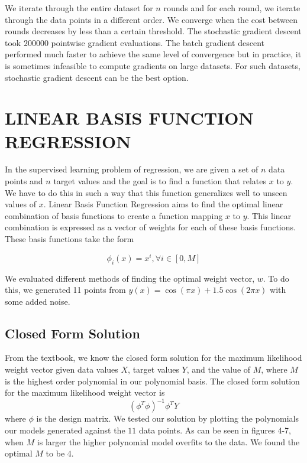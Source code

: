 \documentclass[a4paper,twoside]{article}
\begin{document}
 We iterate through the entire dataset for $n$ rounds and for each round, we iterate through the data points in a different order. We converge when the cost between rounds decreases by less than a certain threshold. The stochastic gradient descent took $200000$ pointwise gradient evaluations. The batch gradient descent performed much faster to achieve the same level of convergence but in practice, it is sometimes infeasible to compute gradients on large datasets. For such datasets, stochastic gradient descent can be the best option.



\section{\uppercase{Linear Basis Function Regression}}

In the supervised learning problem of regression, we are given a set of $n$ data points and $n$ target values and the goal is to find a function that relates $x$ to $y$. We have to do this in such a way that this function generalizes well to unseen values of $x$. Linear Basis Function Regression aims to find the optimal linear combination of basis functions to create a function mapping $x$ to $y$. This linear combination is expressed as a vector of weights for each of these basis functions. These basis functions take the form

\begin{equation}
\phi_i(x) = x^i,  \forall i \in [0,M]
\end{equation}

We evaluated different methods of finding the optimal weight vector, $w$. To do this, we generated 11 points from $y(x) = \cos(\pi x)+1.5 \cos(2 \pi x)$ with some added noise. 

\subsection{Closed Form Solution}

From the textbook, we know the closed form solution for the maximum likelihood weight vector given data values $X$, target values $Y$, and the value of $M$, where $M$ is the highest order polynomial in our polynomial basis. The closed form solution for the maximum likelihood weight vector is
\begin{equation}
(\phi^T \phi)^{-1} \phi^T Y
\end{equation}
where $\phi$ is the design matrix. We tested our solution by plotting the polynomials our models generated against the $11$ data points. As can be seen in figures 4-7, when $M$ is larger the higher polynomial model overfits to the data. We found the optimal $M$ to be $4$.
\end{document}
